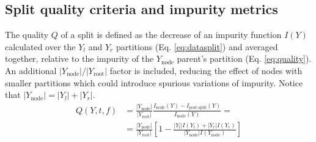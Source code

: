 \documentclass[conference]{IEEEtran}
\begin{document}

\subsection{Split quality criteria and impurity metrics}
\label{sec:criteria}

The quality $Q$ of a split is defined as the decrease of an impurity function $I(Y)$ calculated over the $Y_l$ and $Y_r$ partitions (Eq. \ref{eq:datasplit}) and averaged together, relative to the impurity of the $Y_\text{node}$ parent's partition (Eq. \ref{eq:quality}). An additional $|Y_\text{node}|/|Y_\text{root}|$ factor is included, reducing the effect of nodes with smaller partitions which could introduce spurious variations of impurity. Notice that $|Y_\text{node}|=|Y_l|+|Y_r|$.
%
\begin{equation}
    \begin{split}
    Q(Y, t, f)
        &=
            \frac{|Y_\text{node}|}{|Y_\text{root}|}
            \frac{I_\text{node}(Y)-I_{\text{post-split}}(Y)}{I_\text{node}(Y)} =\\
        &=
            \frac{|Y_\text{node}|}{|Y_\text{root}|}
            \left[
                1
                - \frac{|Y_l| I(Y_l)+ |Y_r|I(Y_r)}
                    {|Y_\text{node}|I(Y_\text{node})}
            \right]
    \end{split}
    \label{eq:quality}
\end{equation}
\end{document}
